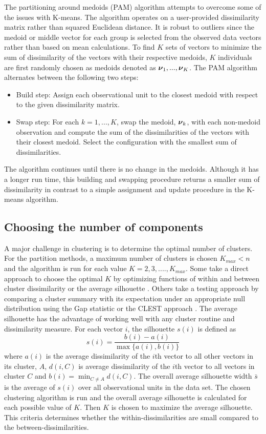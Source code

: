 The partitioning around medoids (PAM) algorithm attempts to overcome some of the issues with K-means. The algorithm operates on a user-provided dissimilarity matrix rather than squared Euclidean distance. It is robust to outliers since the medoid or middle vector for each group is selected from the observed data vectors rather than based on mean calculations. To find $K$ sets of vectors to minimize the sum of dissimilarity of the vectors with their respective medoids, $K$ individuals are first randomly chosen as medoids denoted as $\boldsymbol \nu_{1},...,\boldsymbol \nu_{K}$. The PAM algorithm alternates between the following two steps:
 \begin{itemize}
\item Build step: Assign each observational unit to the closest medoid with respect to the given dissimilarity matrix.
\item Swap step: For each $k=1,...,K$, swap the medoid, $\boldsymbol\nu_{k}$, with each non-medoid observation and compute the sum of the dissimilarities of the vectors with their closest medoid. Select the configuration with the smallest sum of dissimilarities.
\end{itemize}
The algorithm continues until there is no change in the medoids. Although it has a longer run time, this building and swapping procedure returns a smaller sum of dissimilarity in contrast to a simple assignment and update procedure in the K-means algorithm. 

\subsection{Choosing the number of components}
A major challenge in clustering is to determine the optimal number of clusters. For the partition methods, a maximum number of clusters is chosen $K_{max}<n$ and the algorithm is run for each value $K=2,3,....,K_{max}$. Some take a direct approach to choose the optimal $K$  by optimizing functions of within and between cluster dissimilarity \cite{mulligan1985} or the average silhouette \cite{kaufman1990}. Others take a testing approach by comparing a cluster summary with its expectation under an appropriate null distribution using the Gap statistic \cite{tibshirani2001} or the CLEST approach \cite{dudoit2002}. The average silhouette has the advantage of working well with any cluster routine and dissimilarity measure. For each vector $i$, the silhouette $s(i)$ is defined as
$$s(i)=\frac{b(i)-a(i)}{\max\{a(i),b(i)\}}$$
where $a(i)$ is the average dissimilarity of the $i$th vector to all other vectors in its cluster, $A$, $d(i,C)$ is average dissimilarity of the $i$th vector to all vectors in cluster $C$ and $b(i)=\min_{C\not= A} d(i,C)$. The overall average silhouette width $\bar{s}$ is the average of $s(i)$ over all observational units in the data set. The chosen clustering algorithm is run and the overall average silhouette is calculated for each possible value of $K$. Then $K$ is chosen to maximize the average silhouette. This criteria determines whether the within-dissimilarities are small compared to the between-dissimilarities. 

